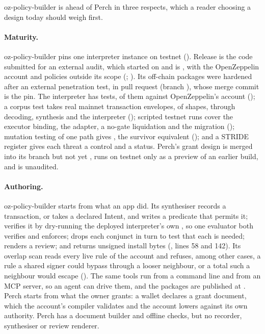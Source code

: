 oz-policy-builder is ahead of Perch in three respects, which a reader choosing a
design today should weigh first.

\paragraph{Maturity.} oz-policy-builder pins one interpreter instance on testnet
(). Release  is
the code submitted for an external audit, which started on
 and is , with the OpenZeppelin
account and policies outside its scope (;
). Its off-chain packages were hardened after
an external penetration test, in pull request  (branch
), whose merge commit is the pin. The interpreter has
 tests,  of them against
OpenZeppelin's  account (); a
corpus test takes  real mainnet transaction envelopes, of
 shapes, through decoding, synthesis and the interpreter
(); scripted testnet runs
cover the executor binding, the adapter, a no-gate liquidation and the
 migration (); mutation
testing of one path gives , the survivor equivalent
(); and a STRIDE register gives each threat a
control and a status. Perch's grant design is merged into its  branch but not
yet , runs on testnet only as a preview of an earlier build, and is
unaudited.

\paragraph{Authoring.} oz-policy-builder starts from what an app did. Its
synthesiser records a transaction, or takes a declared Intent, and writes a
predicate that permits it; verifies it by dry-running the deployed
interpreter's own , so one evaluator both verifies and enforces;
drops each conjunct in turn to test that each is needed; renders a
review; and returns unsigned install bytes
(, lines 58 and 142). Its overlap scan reads every
live rule of the account and refuses, among other cases, a rule a shared signer
could bypass through a looser neighbour, or a total such a neighbour would escape
().
The same  tools run from a command line and from an MCP
server, so an agent can drive them, and the packages are published at
. Perch starts from what the owner grants: a wallet
declares a grant document, which the account's compiler validates and the
account lowers against its own authority. Perch has a document builder and
offline checks, but no recorder, synthesiser or review renderer.

